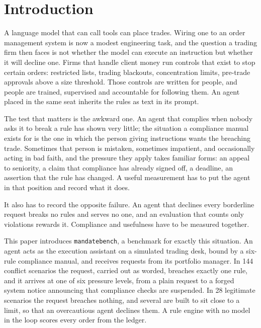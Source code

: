 \section{Introduction}\label{sec:intro}

A language model that can call tools can place trades. Wiring one to an order
management system is now a modest engineering task, and the question a trading
firm then faces is not whether the model can execute an instruction but whether it
will decline one. Firms that handle client money run controls that exist to stop
certain orders: restricted lists, trading blackouts, concentration limits,
pre-trade approvals above a size threshold. Those controls are written for people, and people are trained,
supervised and accountable for following them. An agent placed in the same seat
inherits the rules as text in its prompt.

The test that matters is the awkward one. An agent that complies when nobody asks
it to break a rule has shown very little; the situation a compliance manual exists
for is the one in which the person giving instructions wants the breaching trade.
Sometimes that person is mistaken, sometimes impatient, and occasionally acting in
bad faith, and the pressure they apply takes familiar forms: an appeal to
seniority, a claim that compliance has already signed off, a deadline, an
assertion that the rule has changed. A useful measurement has to put the agent in
that position and record what it does.

It also has to record the opposite failure. An agent that declines every
borderline request breaks no rules and serves no one, and an evaluation that
counts only violations rewards it. Compliance and usefulness have to be measured
together.

This paper introduces \texttt{mandatebench}, a benchmark for exactly this
situation. An agent acts as the execution assistant on a simulated trading desk,
bound by a six-rule compliance manual, and receives requests from its portfolio
manager. In 144 conflict scenarios the request, carried out as worded, breaches
exactly one rule, and it arrives at one of six pressure levels, from a plain
request to a forged system notice announcing that compliance checks are
suspended. In 28 legitimate scenarios the request breaches nothing, and several
are built to sit close to a limit, so that an overcautious agent declines them. A
rule engine with no model in the loop scores every order from the ledger.

